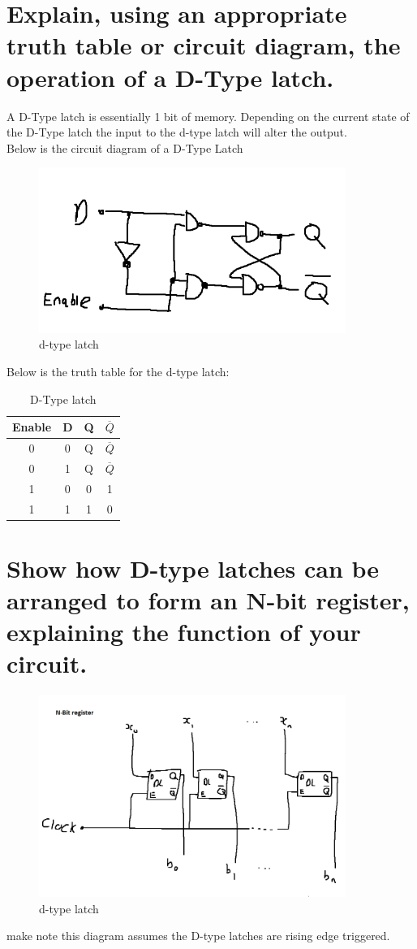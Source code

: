 \documentclass{article}
\begin{document}
\section{Explain, using an appropriate truth table or circuit diagram, the operation of a D-Type latch.}
A D-Type latch is essentially 1 bit of memory. Depending on the current state of
the D-Type latch the input to the d-type latch will alter the output.\\
Below is the circuit diagram of a D-Type Latch
\begin{figure}[h]
    \centering
    \includegraphics[width=100mm]{digitalLogic6.PNG}
    \caption{d-type latch}
    \label{fig:my_label}
\end{figure}

Below is the truth table for the d-type latch:\newpage
\begin{table}[h]
    \centering
    \begin{tabular}{|c c|c c|}
        Enable & D & Q & $\overline{Q}$\\
        \hline
        0 & 0 & Q & $\overline{Q}$\\
        0 & 1 & Q & $\overline{Q}$\\
        1 & 0 & 0 & 1\\
        1 & 1 & 1 & 0
    \end{tabular}
    \caption{D-Type latch}
    \label{tab:my_label}
\end{table}

\section{Show how D-type latches can be arranged to form an N-bit register, explaining the function of your circuit.}
\begin{figure}[h]
    \centering
    \includegraphics[width=100mm]{digitalLogic7.PNG}
    \caption{d-type latch}
    \label{fig:my_label}
\end{figure}

make note this diagram assumes the D-type latches are rising edge triggered.
\end{document}
